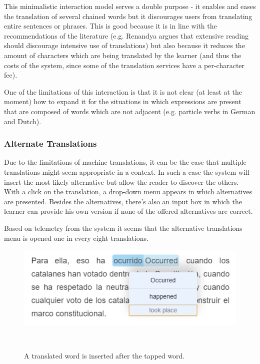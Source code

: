 This minimalistic interaction model serves a double purpose - it enables and eases the translation of several chained words but it discourages users from translating entire sentences or phrases. This is good because it is in line with the recommendations of the literature (e.g. Renandya argues that extensive reading should discourage intensive use of translations\cite{renadya07-power}) but also because it reduces the amount of characters which are being translated by the learner (and thus the costs of the system, since some of the translation services have a per-character fee). 

One of the limitations of this interaction is that it is not clear (at least at the moment) how to expand it for the situations in which expressions are present that are composed of words which are not adjacent (e.g. particle verbs in German and Dutch).


\subsubsection{Alternate Translations}
Due to the limitations of machine translations, it can be the case that multiple translations might seem appropriate in a context. In such a case the system will insert the most likely alternative but allow the reader to discover the others. With a click on the translation, a drop-down menu appears in which alternatives are presented. Besides the alternatives, there's also an input box in which the learner can provide his own version if none of the offered alternatives are correct. 

Based on telemetry from the system it seems that  the alternative translations menu is opened one in every eight translations. 

\begin{figure}[h!]
\centering
  \includegraphics[width=0.8\columnwidth]{figures/translation_alter_menu}
  \caption{A translated word is inserted after the tapped word.}~\label{fig:registrations}
\end{figure}

